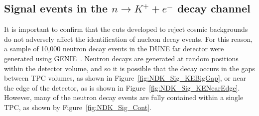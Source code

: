 \subsection{Signal events in the $n \rightarrow K^{+} + e^{-}$ decay channel} \label{sec:NDKSig}
It is important to confirm that the cuts developed to reject cosmic backgrounds do not adversely affect the identification of nucleon decay events. For this reason, a sample of 10,000 neutron decay events in the DUNE far detector were generated using GENIE~\citep{GENIE}. Neutron decays are generated at random positions within the detector volume, and so it is possible that the decay occurs in the gaps between TPC volumes, as shown in Figure~\ref{fig:NDK_Sig_KEBigGap}, or near the edge of the detector, as is shown in Figure~\ref{fig:NDK_Sig_KENearEdge}. However, many of the neutron decay events are fully contained within a single TPC, as shown by Figure~\ref{fig:NDK_Sig_Cont}. \\

